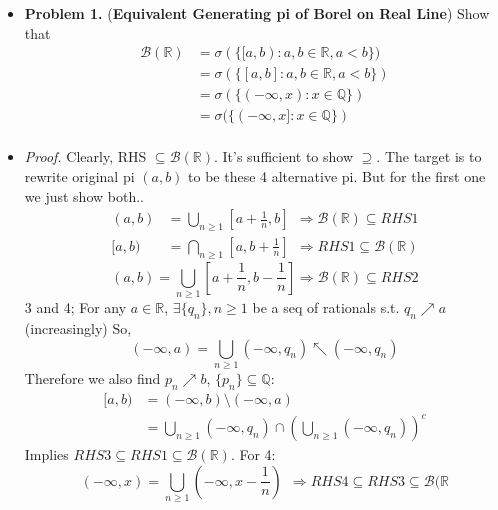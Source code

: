 \documentclass[a4paper,12pt,twoside]{book}
\begin{document}
\begin{itemize}
	\item[]\textbf{Problem 1.} (\textbf{Equivalent Generating pi of Borel on Real Line}) Show that
	\begin{equation}
	\begin{split}
		\mathscr{B}(\mathbb{R})&=\sigma(\{[a,b): a,b\in \mathbb{R}, a<b\})\\
		&=\sigma(\{[a,b]: a,b\in \mathbb{R}, a<b\})\\
		&=\sigma(\{(-\infty,x): x\in \mathbb{Q}\})\\
		&=\sigma(\{(-\infty,x]: x\in \mathbb{Q}\})\\
	\end{split}
	\end{equation}

	\item[] \textit{Proof.} Clearly, RHS $\subseteq \mathscr{B}(\mathbb{R})$. It's sufficient to show $\supseteq$. The target is to rewrite original pi $(a,b)$ to be these 4 alternative pi. But for the first one we just show both.\newline.
	\begin{equation}
		\begin{split}
			(a,b)&=\bigcup_{n\geq 1}[a+\frac{1}{n},b]~~ \Rightarrow \mathscr{B}(\mathbb{R})\subseteq RHS1\\
			[a,b)&=\bigcap_{n\geq 1}[a, b+\frac{1}{n}]~~\Rightarrow RHS1 \subseteq \mathscr{B}(\mathbb{R})
		\end{split}
	\end{equation}
	\begin{equation}
		(a,b)=\bigcup_{n\geq 1}[a+\frac{1}{n},b-\frac{1}{n}] \Rightarrow \mathscr{B}(\mathbb{R}) \subseteq RHS2
	\end{equation}
	3 and 4; For any $a\in \mathbb{R}$, $\exists \{q_n\}, n\geq 1$ be a seq of rationals s.t. $q_n \nearrow a$ (increasingly) So,
	\begin{equation}
		(-\infty, a)=\bigcup_{n\geq 1}(-\infty, q_n)\nwarrow (-\infty, q_n)
	\end{equation}
	Therefore we also find $p_n\nearrow b$, $\{p_n\}\subseteq \mathbb{Q}$:
	\begin{equation}
		\begin{split}
			[a,b)&=(-\infty,b)\setminus(-\infty, a)\\
			&=\bigcup_{n\geq 1}(-\infty, q_n) \cap \left(\bigcup_{n\geq 1}(-\infty, q_n)\right)^c
		\end{split}
	\end{equation}
	Implies $RHS3 \subseteq RHS1 \subseteq \mathscr{B}(\mathbb{R})$. For 4:
	\begin{equation}
		(-\infty,x) = \bigcup_{n\geq 1}(-\infty, x-\frac{1}{n})~~\Rightarrow RHS4 \subseteq RHS3 \subseteq \mathscr{B}(\mathbb{R}
	\end{equation}
\end{itemize}
\end{document}

